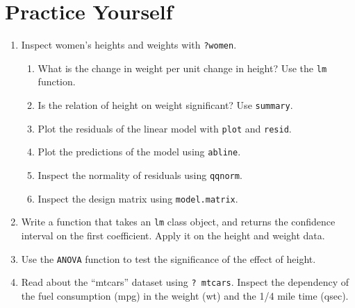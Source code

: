 \documentclass[]{book}
\providecommand{\tightlist}{%
  \setlength{\itemsep}{0pt}\setlength{\parskip}{0pt}}
\theoremstyle{definition}
\theoremstyle{definition}
\theoremstyle{definition}
\theoremstyle{remark}
\begin{document}
\hypertarget{practice-yourself-3}{%
\section{Practice Yourself}\label{practice-yourself-3}}

\begin{enumerate}
\def\labelenumi{\arabic{enumi}.}
\item
  Inspect women's heights and weights with \texttt{?women}.

  \begin{enumerate}
  \def\labelenumii{\arabic{enumii}.}
  \tightlist
  \item
    What is the change in weight per unit change in height? Use the \texttt{lm} function.
  \item
    Is the relation of height on weight significant? Use \texttt{summary}.
  \item
    Plot the residuals of the linear model with \texttt{plot} and \texttt{resid}.
  \item
    Plot the predictions of the model using \texttt{abline}.
  \item
    Inspect the normality of residuals using \texttt{qqnorm}.
  \item
    Inspect the design matrix using \texttt{model.matrix}.
  \end{enumerate}
\item
  Write a function that takes an \texttt{lm} class object, and returns the confidence interval on the first coefficient. Apply it on the height and weight data.
\item
  Use the \texttt{ANOVA} function to test the significance of the effect of height.
\item
  Read about the ``mtcars'' dataset using \texttt{?\ mtcars}. Inspect the dependency of the fuel consumption (mpg) in the weight (wt) and the 1/4 mile time (qsec).


\end{enumerate}
\end{document}
